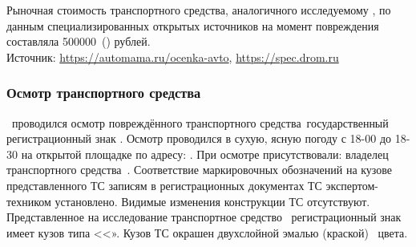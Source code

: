 	
%
	
\vspace{3mm}
%
%


Рыночная стоимость  транспортного средства, аналогичного исследуемому , по данным специализированных открытых источников на момент повреждения  составляла 
\def\рынок{500000}
\рынок \,  (\числопрописью{\рынок}) рублей.\\
Источник:  \url{https://automama.ru/ocenka-avto}, \url{https://spec.drom.ru}


	\subsubsection{Осмотр транспортного средства}
	
   \osm\,  проводился осмотр повреждённого транспортного средства \tc\,государственный регистрационный знак \grz. Осмотр проводился в сухую, ясную погоду с 18-00  до 18-30 на открытой площадке   по адресу: . При осмотре присутствовали:  владелец транспортного средства  \,.  Соответствие маркировочных обозначений на кузове представленного ТС записям в регистрационных документах ТС экспертом-техником установлено. Видимые изменения конструкции ТС отсутствуют. Представленное на исследование транспортное средство \, регистрационный знак \, имеет кузов типа <<». Кузов ТС окрашен двухслойной   %
   эмалью (краской)  \colr \, цвета.
   
                       
